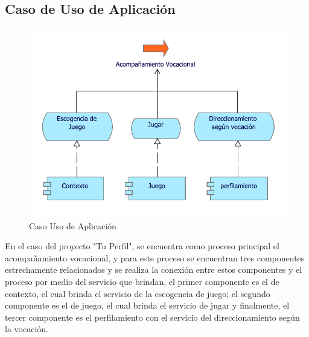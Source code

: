 \newpage

\subsection{Caso  de Uso de Aplicación}
\begin{figure}[h!]
	\centering
	\includegraphics[width=.8\linewidth]{imgs/caso/aplicacion/UsoAplicacion}
	\caption{Caso Uso de Aplicación}
\end{figure}

En el caso del proyecto "Tu Perfil", se encuentra como proceso principal el acompañamiento vocacional, y para este proceso se encuentran tres componentes estrechamente relacionados y se realiza la conexión entre estos componentes y el proceso por medio del servicio que brindan, el primer componente es el de contexto, el cual brinda el servicio de la escogencia de juego; el segundo componente es el de juego, el cual brinda el servicio de jugar y finalmente, el tercer componente es el perfilamiento con el servicio del direccionamiento según la vocación.

\newpage